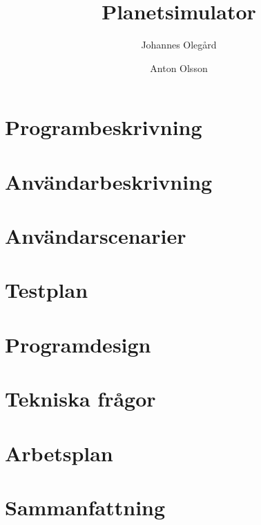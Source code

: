 \documentclass[a4paper, 11pt]{article}
\title{Planetsimulator}
\author{Johannes Olegård \and Anton Olsson}
\begin{document}
\maketitle

\section{Programbeskrivning}
\label{sec:progb}


\vspace{12pt}

\vspace{12pt}


\section{Användarbeskrivning}
\label{sec:anvb}


\vspace{12pt}

\vspace{12pt}


\section{Användarscenarier}
\label{sec:anvsc}


\vspace{12pt}

\vspace{12pt}


\section{Testplan}
\label{sec:testplan}


\vspace{12pt}

\vspace{12pt}


\section{Programdesign}
\label{sec:design}

\vspace{12pt}

\vspace{12pt}


\section{Tekniska frågor}
\label{sec:qa}

\vspace{12pt}

\vspace{12pt}


\section{Arbetsplan}
\label{sec:arbplan}

\vspace{12pt}

\vspace{12pt}


\section{Sammanfattning}
\end{document}
